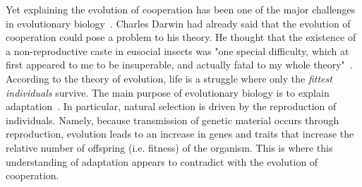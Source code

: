     Yet explaining the evolution of cooperation has been one of the major challenges in evolutionary biology~\parencite{Hamilton1964, Dugatkin2002, West2011a}. Charles Darwin had already said that the evolution of cooperation could pose a problem to his theory. He thought that the existence of a non-reproductive caste in eusocial insects was "one special difficulty, which at first appeared to me to be insuperable, and actually fatal to my whole theory"~\parencite{Darwin1859}. According to the theory of evolution, life is a struggle where only the \emph{fittest individuals} survive. The main purpose of evolutionary biology is to explain adaptation~\parencite{West2011a}. In particular, natural selection is driven by the reproduction of individuals. Namely, because transmission of genetic material occurs through reproduction, evolution leads to an increase in genes and traits that increase the relative number of offspring (i.e. fitness) of the organism. This is where this understanding of adaptation appears to contradict with the evolution of cooperation.




